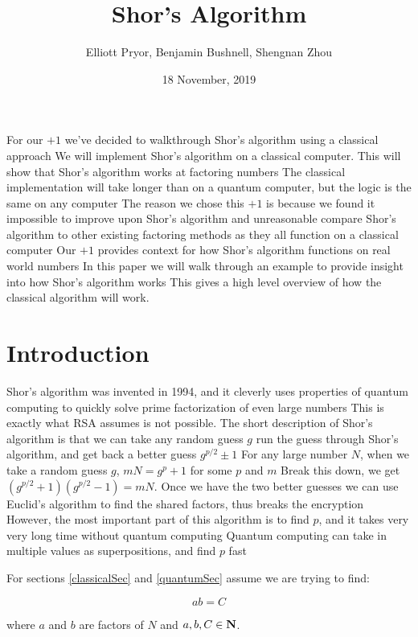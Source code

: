 \documentclass[a4paper]{article}
\title{Shor's Algorithm}
\author{Elliott Pryor, Benjamin Bushnell, Shengnan Zhou}
\date{18 November, 2019}
\begin{document}
\maketitle %



For our $+1$ we've decided to walkthrough Shor's algorithm using a classical approach
 We will implement Shor's algorithm on a classical computer. This will show that Shor's algorithm works at factoring numbers
 The classical implementation will take longer than on a quantum computer, but the logic is the same on any computer
 The reason we chose this $+1$ is because we found it impossible to improve upon Shor's algorithm
 and unreasonable compare Shor's algorithm to other existing factoring methods as they all function on a classical computer
 Our $+1$ provides context for how Shor's algorithm functions on real world numbers
In this paper we will walk through an example to provide insight into how Shor's algorithm works
 This gives a high level overview of how the classical algorithm will work.




\section{Introduction}

Shor's algorithm was invented in 1994, and it cleverly uses properties of quantum computing to quickly solve prime factorization of even large numbers
 This is exactly what RSA assumes is not possible. The short description of Shor's algorithm is that we can take any random guess $g$
 run the guess through Shor's algorithm, and get back a better guess $g^{p/2} \pm 1$
 For any large number $N$, when we take a random guess $g$, $mN = g^p +1$ for some $p$ and $m$
 Break this down, we get $(g^{p/2}+1)(g^{p/2}-1) = mN$. Once we have the two better guesses
 we can use Euclid's algorithm to find the shared factors, thus breaks the encryption
 However, the most important part of this algorithm is to find $p$, and it takes very very long time without quantum computing
 Quantum computing can take in multiple values as superpositions, and find $p$ fast


For sections \ref{classicalSec} and \ref{quantumSec} assume we are trying to find: 

$$ab = C$$

where $a$ and $b$ are factors of $N$ and $a,b,C \in \mathbf{N}$.
\end{document}
